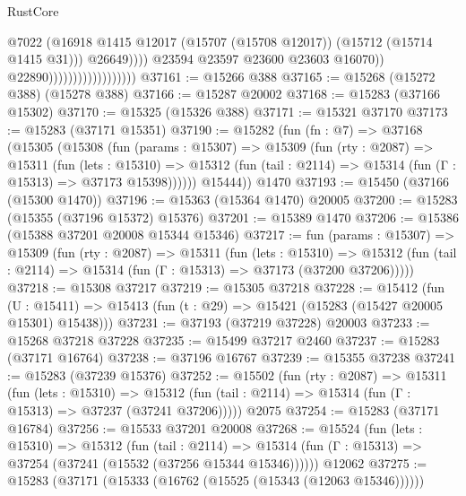 \begin{lexlean}{RustCore}
\begin{coremodule}
                                                    @7022
                                                    (@16918
                                                      @1415
                                                      @12017
                                                      (@15707 (@15708 @12017))
                                                      (@15712 (@15714 @1415 @31)))
                                                    @26649))))
                                            @23594
                                            @23597
                                            @23600
                                            @23603
                                            @16070))
                                        @22890))))))))))))))))))
@37161 := @15266 @388
@37165 := @15268 (@15272 @388) (@15278 @388)
@37166 := @15287 @20002
@37168 := @15283 (@37166 @15302)
@37170 := @15325 (@15326 @388)
@37171 := @15321 @37170
@37173 := @15283 (@37171 @15351)
@37190 := @15282
    (fun (fn : @7) =>
    @37168
      (@15305
        (@15308
          (fun (params : @15307) =>
          @15309
            (fun (rty : @2087) =>
            @15311
              (fun (lets : @15310) =>
              @15312 (fun (tail : @2114) => @15314 (fun (Γ : @15313) => @37173 @15398))))))
        @15444))
    @1470
@37193 := @15450 (@37166 (@15300 @1470))
@37196 := @15363 (@15364 @1470) @20005
@37200 := @15283 (@15355 (@37196 @15372) @15376)
@37201 := @15389 @1470
@37206 := @15386 (@15388 @37201 @20008 @15344 @15346)
@37217 := fun (params : @15307) =>
  @15309
    (fun (rty : @2087) =>
    @15311
      (fun (lets : @15310) =>
      @15312 (fun (tail : @2114) => @15314 (fun (Γ : @15313) => @37173 (@37200 @37206)))))
@37218 := @15308 @37217
@37219 := @15305 @37218
@37228 := @15412
    (fun (U : @15411) => @15413 (fun (t : @29) => @15421 (@15283 (@15427 @20005 @15301) @15438)))
@37231 := @37193 (@37219 @37228) @20003
@37233 := @15268 @37218 @37228
@37235 := @15499 @37217 @2460
@37237 := @15283 (@37171 @16764)
@37238 := @37196 @16767
@37239 := @15355 @37238
@37241 := @15283 (@37239 @15376)
@37252 := @15502
    (fun (rty : @2087) =>
    @15311
      (fun (lets : @15310) =>
      @15312 (fun (tail : @2114) => @15314 (fun (Γ : @15313) => @37237 (@37241 @37206)))))
    @2075
@37254 := @15283 (@37171 @16784)
@37256 := @15533 @37201 @20008
@37268 := @15524
    (fun (lets : @15310) =>
    @15312
      (fun (tail : @2114) =>
      @15314 (fun (Γ : @15313) => @37254 (@37241 (@15532 (@37256 @15344 @15346))))))
    @12062
@37275 := @15283 (@37171 (@15333 (@16762 (@15525 (@15343 (@12063 @15346))))))

\end{coremodule}
\end{lexlean}
